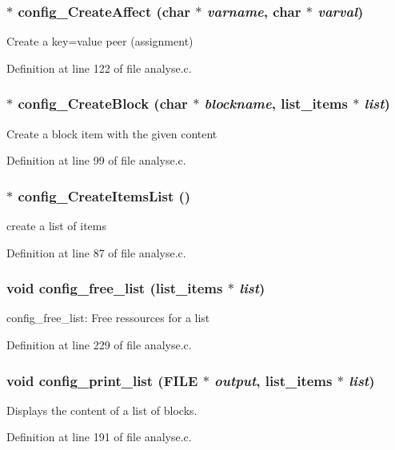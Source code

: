 \subsubsection[{config\_\-CreateAffect}]{$\ast$ config\_\-CreateAffect (char $\ast$ {\em varname}, \/  char $\ast$ {\em varval})}\label{analyse_8c_19694ceaab9125cba46213b5f0857676}


Create a key=value peer (assignment) 

Definition at line 122 of file analyse.c.
\subsubsection[{config\_\-CreateBlock}]{$\ast$ config\_\-CreateBlock (char $\ast$ {\em blockname}, \/  {\bf list\_\-items} $\ast$ {\em list})}\label{analyse_8c_be9e49a5e342b113519db7bcb9ad8ee3}


Create a block item with the given content 

Definition at line 99 of file analyse.c.
\subsubsection[{config\_\-CreateItemsList}]{$\ast$ config\_\-CreateItemsList ()}\label{analyse_8c_b9e49c47a113c09943b6afebde940857}


create a list of items 

Definition at line 87 of file analyse.c.
\subsubsection[{config\_\-free\_\-list}]{\setlength{\rightskip}{0pt plus 5cm}void config\_\-free\_\-list ({\bf list\_\-items} $\ast$ {\em list})}\label{analyse_8c_dc8ddb7f244c0bb2aeb9af15ebd3545c}


config\_\-free\_\-list: Free ressources for a list 

Definition at line 229 of file analyse.c.
\subsubsection[{config\_\-print\_\-list}]{\setlength{\rightskip}{0pt plus 5cm}void config\_\-print\_\-list (FILE $\ast$ {\em output}, \/  {\bf list\_\-items} $\ast$ {\em list})}\label{analyse_8c_11266361714a3c55a0d585dd118aaec5}


Displays the content of a list of blocks. 

Definition at line 191 of file analyse.c.